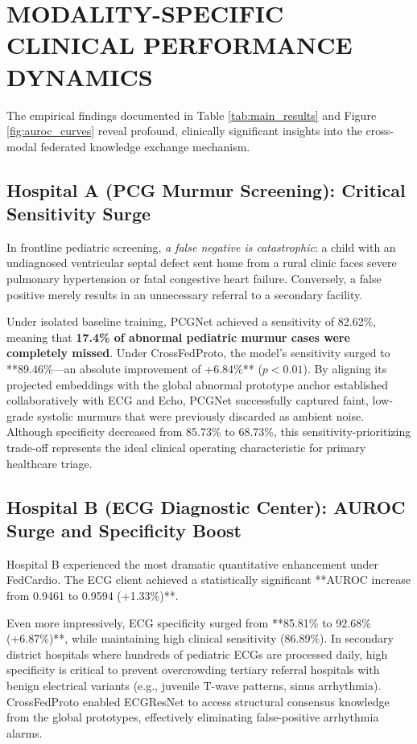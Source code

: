 \documentclass[12pt,a4paper]{amritareport}
\begin{document}
\section{MODALITY-SPECIFIC CLINICAL PERFORMANCE DYNAMICS}

The empirical findings documented in Table \ref{tab:main_results} and Figure \ref{fig:auroc_curves} reveal profound, clinically significant insights into the cross-modal federated knowledge exchange mechanism.

\subsection{Hospital A (PCG Murmur Screening): Critical Sensitivity Surge}
In frontline pediatric screening, \textit{a false negative is catastrophic}: a child with an undiagnosed ventricular septal defect sent home from a rural clinic faces severe pulmonary hypertension or fatal congestive heart failure. Conversely, a false positive merely results in an unnecessary referral to a secondary facility.

Under isolated baseline training, PCGNet achieved a sensitivity of 82.62\%, meaning that \textbf{17.4\% of abnormal pediatric murmur cases were completely missed}. Under CrossFedProto, the model's sensitivity surged to **89.46\%—an absolute improvement of +6.84\%** ($p < 0.01$). By aligning its projected embeddings with the global abnormal prototype anchor established collaboratively with ECG and Echo, PCGNet successfully captured faint, low-grade systolic murmurs that were previously discarded as ambient noise. Although specificity decreased from 85.73\% to 68.73\%, this sensitivity-prioritizing trade-off represents the ideal clinical operating characteristic for primary healthcare triage.

\subsection{Hospital B (ECG Diagnostic Center): AUROC Surge and Specificity Boost}
Hospital B experienced the most dramatic quantitative enhancement under FedCardio. The ECG client achieved a statistically significant **AUROC increase from 0.9461 to 0.9594 (+1.33\%)**. 

Even more impressively, ECG specificity surged from **85.81\% to 92.68\% (+6.87\%)**, while maintaining high clinical sensitivity (86.89\%). In secondary district hospitals where hundreds of pediatric ECGs are processed daily, high specificity is critical to prevent overcrowding tertiary referral hospitals with benign electrical variants (e.g., juvenile T-wave patterns, sinus arrhythmia). CrossFedProto enabled ECGResNet to access structural consensus knowledge from the global prototypes, effectively eliminating false-positive arrhythmia alarms.
\end{document}
